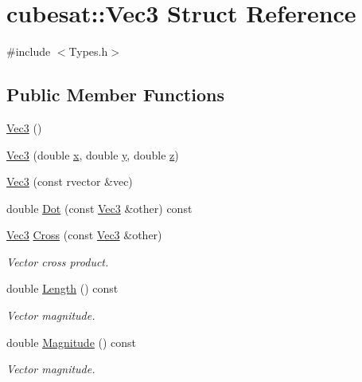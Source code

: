 \hypertarget{structcubesat_1_1Vec3}{}\section{cubesat\+:\+:Vec3 Struct Reference}
\label{structcubesat_1_1Vec3}


{\ttfamily \#include $<$Types.\+h$>$}

\subsection*{Public Member Functions}
\begin{DoxyCompactItemize}
\item 
\hyperlink{structcubesat_1_1Vec3_aec3cf560d5c4e7c08e1bc03c79f977e0}{Vec3} ()
\item 
\hyperlink{structcubesat_1_1Vec3_aacaffc6219624847aa535defa95e8afa}{Vec3} (double \hyperlink{structcubesat_1_1Vec3_ab8dbb8bcf992eddef4692cd81d0cee59}{x}, double \hyperlink{structcubesat_1_1Vec3_a1cb7ad90c1fc62bd6c111d77215191bc}{y}, double \hyperlink{structcubesat_1_1Vec3_a1b86ce8ea2819a0a1a018dc31eda6265}{z})
\item 
\hyperlink{structcubesat_1_1Vec3_ad2568fe3bd05d69a9d182925be0593bb}{Vec3} (const rvector \&vec)
\item 
double \hyperlink{structcubesat_1_1Vec3_a12820bea7598591bcab475198f5ee79a}{Dot} (const \hyperlink{structcubesat_1_1Vec3}{Vec3} \&other) const
\item 
\hyperlink{structcubesat_1_1Vec3}{Vec3} \hyperlink{structcubesat_1_1Vec3_a698430b60dd526e9684d0581917d9a62}{Cross} (const \hyperlink{structcubesat_1_1Vec3}{Vec3} \&other)
\begin{DoxyCompactList}\small\item\em Vector cross product. \end{DoxyCompactList}\item 
double \hyperlink{structcubesat_1_1Vec3_ab3e281e138bce0589ad4aaa328fe6b39}{Length} () const
\begin{DoxyCompactList}\small\item\em Vector magnitude. \end{DoxyCompactList}\item 
double \hyperlink{structcubesat_1_1Vec3_aaea2a6f5fb2effb88b791a898c93d58d}{Magnitude} () const
\begin{DoxyCompactList}\small\item\em Vector magnitude. \end{DoxyCompactList}\item 

\end{DoxyCompactItemize}
